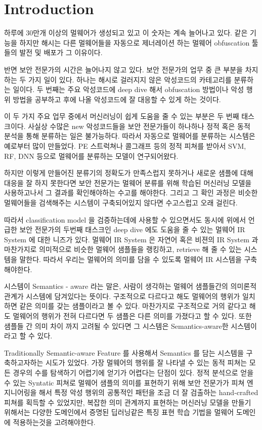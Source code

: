 \section{Introduction}


하루에 30만개 이상의 멀웨어가 생성되고 있고 이 숫자는 계속 늘어나고 있다. %
같은 기능을 하지만 해시는 다른 멀웨어들을 자동으로 제너레이션 하는 멀웨어 obfuscation 툴들의 발전 및 배포가 그 이유이다. 

반면 보안 전문가의 시간은 늘어나지 않고 있다. 보안 전문가의 업무 중 큰 부분을 차지하는 두 가지 일이 있다. 하나는 해시로 걸러지지 않은 악성코드의 카테고리를 분류하는 일이다. 두 번째는 주요 악성코드에 deep dive 해서 obfuscation 방법이나 악성 행위 방법을 공부하고 후에 나올 악성코드에 잘 대응할 수 있게 하는 것이다.   

이 두 가지 주요 업무 중에서 머신러닝이 쉽게 도움을 줄 수 있는 부분은 두 번째 태스크이다. 사실상 수많은 new 악성코드들을 보안 전문가들이 하나하나 정적 혹은 동적 분석을 통해 분류하는 일은 불가능하다. 따라서 자동으로 멀웨어를 분류하는 시스템은 예로부터 많이 만들었다. PE 스트럭쳐나 콜그래프 등의 정적 피쳐를 받아서 SVM, RF, DNN 등으로 멀웨어를 분류하는 모델이 연구되어왔다.   

하지만 이렇게 만들어진 분류기의 정확도가 만족스럽지 못하거나 새로운 샘플에 대해 대응을 잘 하지 못한다면 보안 전문가는 멀웨어 분류를 위해 학습된 머신러닝 모델을 사용하고나서 그 결과를 확인해야하는 수고를 해야한다. 그리고 그 확인 과정은 비슷한 멀웨어들을 검색해주는 시스템이 구축되어있지 않다면 수고스럽고 오래 걸린다. 

따라서 classification model 을 검증하는데에 사용할 수 있으면서도 동시에 위에서 언급한 보안 전문가의 두번째 태스크인 deep dive 에도 도움을 줄 수 있는 멀웨어 IR System 에 대한 니즈가 있다. 멀웨어 IR System 은 자연어 혹은 비젼의 IR System 과 마찬가지로 의미적으로 비슷한 멀웨어 샘플들을 랭킹하고, retrieve 해 줄 수 있는 시스템을 말한다. 따라서 우리는 멀웨어의 의미를 담을 수 있도록 멀웨어 IR 시스템을 구축해야한다. 

시스템이 Semantics - aware 라는 말은, 사람이 생각하는 멀웨어 샘플들간의 의미론적 관계가 시스템에 담겨있다는 뜻이다. 구조적으로 다르다고 해도 멀웨어의 행위가 일치하면 같은 의미를 갖는 샘플이라고 볼 수 있다. 마찬가지로 구조적으로 거의 같다고 해도 멀웨어의 행위가 전혀 다르다면 두 샘플은 다른 의미를 가졌다고 할 수 있다. 또한 샘플들 간 의미 차이 까지 고려될 수 있다면 그 시스템은 Semantics-aware한 시스템이라고 할 수 있다. 
 
Traditionally Semantic-aware Feature 를 사용해서 Semantics 를 담는 시스템을 구축하고자하는 시도가 있었다. 가장 멀웨어의 행위를 잘 나타낼 수 있는 동적 피쳐는 모든 경우의 수를 탐색하기 어렵기에 얻기가 어렵다는 단점이 있다. 정적 분석으로 얻을 수 있는 Syntatic 피쳐로 멀웨어 샘플의 의미를 표현하기 위해 보안 전문가가 피쳐 엔지니어링을 해서 특정 악성 행위의 공통적인 패턴을 조금 더 잘 검출하는 hand-crafted 피쳐를 획득할 수 있었지만, 복잡한 의미 관계까지 표현하는 머신러닝 모델을 만들기 위해서는 다양한 도메인에서 증명된 딥러닝같은 특징 표현 학습 기법을 멀웨어 도메인에 적용하는것을 고려해야한다.
 
